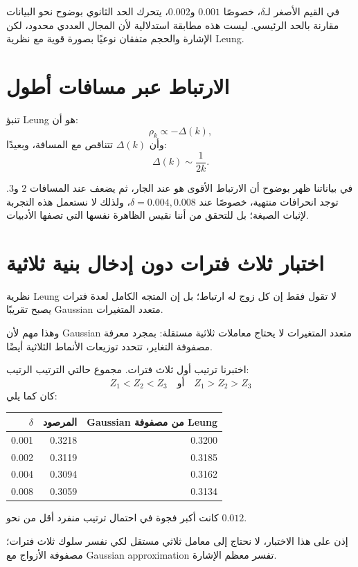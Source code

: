 \documentclass[12pt]{article}
\begin{document}
في القيم الأصغر لـ\(\delta\)، خصوصًا \(0.001\) و\(0.002\)، يتحرك الحد
الثانوي بوضوح نحو البيانات مقارنة بالحد الرئيسي.
ليست هذه مطابقة استدلالية لأن المجال العددي محدود، لكن الإشارة والحجم
متفقان نوعيًا بصورة قوية مع نظرية Leung.

\section{الارتباط عبر مسافات أطول}

تنبؤ Leung هو أن:
\[
\rho_k
\propto
-\Delta(k),
\]
وأن \(\Delta(k)\) تتناقص مع المسافة، وبعيدًا:
\[
\Delta(k)\sim\frac{1}{2k}.
\]

في بياناتنا ظهر بوضوح أن الارتباط الأقوى هو عند الجار، ثم يضعف عند
المسافات \(2\) و\(3\). توجد انحرافات منتهية، خصوصًا عند
\(\delta=0.004,0.008\)، ولذلك لا نستعمل هذه التجربة لإثبات الصيغة؛
بل للتحقق من أننا نقيس الظاهرة نفسها التي تصفها الأدبيات.

\section{اختبار ثلاث فترات دون إدخال بنية ثلاثية}

نظرية Leung لا تقول فقط إن كل زوج له ارتباط؛ بل إن المتجه الكامل
لعدة فترات يصبح تقريبًا Gaussian متعدد المتغيرات.

وهذا مهم لأن Gaussian متعدد المتغيرات لا يحتاج معاملات ثلاثية مستقلة:
بمجرد معرفة مصفوفة التغاير، تتحدد توزيعات الأنماط الثلاثية أيضًا.

اختبرنا ترتيب أول ثلاث فترات.
مجموع حالتي الترتيب الرتيب:
\[
Z_1<Z_2<Z_3
\quad\text{أو}\quad
Z_1>Z_2>Z_3
\]
كان كما يلي:

\begin{center}
\begin{tabular}{rrr}
\toprule
\(\delta\) & المرصود & Gaussian من مصفوفة Leung\\
\midrule
0.001 & 0.3218 & 0.3200\\
0.002 & 0.3119 & 0.3185\\
0.004 & 0.3094 & 0.3162\\
0.008 & 0.3059 & 0.3134\\
\bottomrule
\end{tabular}
\end{center}

كانت أكبر فجوة في احتمال ترتيب منفرد أقل من نحو \(0.012\).

إذن على هذا الاختبار، لا نحتاج إلى معامل ثلاثي مستقل لكي نفسر سلوك
ثلاث فترات؛ مصفوفة الأزواج مع Gaussian approximation تفسر معظم الإشارة.
\end{document}
